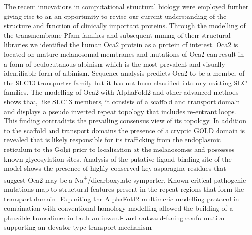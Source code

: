 \documentclass[a4paper,oneside,12pt]{book}
\begin{document}
The recent innovations in computational structural biology were employed further giving rise to an an opportunity to revise our current understanding of the structure and function of clinically important proteins.   Through the modelling of the transmembrane Pfam families and subsequent mining of their structural libraries we identified the human Oca2 protein as a protein of interest.  Oca2 is located on mature melanosomal membranes and mutations of Oca2 can result in a form of oculocutanous albinism which is the most prevalent and visually identifiable form of albinism. Sequence analysis predicts Oca2 to be a member of the SLC13 transporter family but it has not been classified into any existing SLC families.  The modelling of Oca2 with AlphaFold2 and other advanced methods shows that, like SLC13 members, it consists of a scaffold and transport domain and displays a pseudo inverted repeat topology that includes re-entrant loops.  This finding contradicts the prevailing consensus view of its topology.  In addition to the scaffold and transport domains the presence of a cryptic GOLD domain is revealed that is likely responsible for its trafficking from the endoplasmic reticulum to the Golgi prior to localisation at the melanosomes and possesses known glycosylation sites.  Analysis of the putative ligand binding site of the model shows the presence of highly conserved key asparagine residues that suggest Oca2 may be a Na\textsuperscript{+}/dicarboxylate symporter.  Known critical pathogenic mutations map to structural features present in the repeat regions that form the transport domain.  Exploiting the AlphaFold2 multimeric modelling protocol in combination with conventional homology modelling allowed the building of a plausible homodimer in both an inward- and outward-facing conformation supporting an elevator-type transport mechanism.


\newpage
\raggedright %

\newpage \tableofcontents
\newpage \listoffigures
\newpage \listoftables
\newpage

\mainmatter
\setlength{\parindent}{3ex}







\renewcommand\bibname{References} 



%
\end{document}
